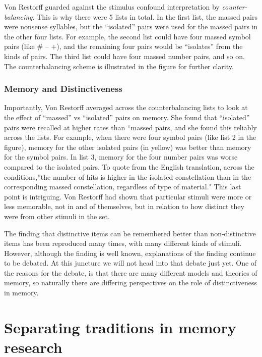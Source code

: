 \documentclass[
  oneside,
  12pt]{crumpbook}
\begin{document}
Von Restorff guarded against the stimulus confound interpretation by \emph{counter-balancing}. This is why there were 5 lists in total. In the first list, the massed pairs were nonsense syllables, but the ``isolated'' pairs were used for the massed pairs in the other four lists. For example, the second list could have four massed symbol pairs (like \# -- +), and the remaining four pairs would be ``isolates'' from the kinds of pairs. The third list could have four massed number pairs, and so on. The counterbalancing scheme is illustrated in the figure for further clarity.

\hypertarget{memory-and-distinctiveness}{%
\subsubsection{Memory and Distinctiveness}\label{memory-and-distinctiveness}}

Importantly, Von Restorff averaged across the counterbalancing lists to look at the effect of ``massed'' vs ``isolated'' pairs on memory. She found that ``isolated'' pairs were recalled at higher rates than ``massed pairs, and she found this reliably across the lists. For example, when there were four symbol pairs (like list 2 in the figure), memory for the other isolated pairs (in yellow) was better than memory for the symbol pairs. In list 3, memory for the four number pairs was worse compared to the isolated pairs. To quote from the English translation, across the conditions,''the number of hits is higher in the isolated constellation than in the corresponding massed constellation, regardless of type of material." This last point is intriguing. Von Restorff had shown that particular stimuli were more or less memorable, not in and of themselves, but in relation to how distinct they were from other stimuli in the set.

The finding that distinctive items can be remembered better than non-distinctive items has been reproduced many times, with many different kinds of stimuli. However, although the finding is well known, explanations of the finding continue to be debated. At this juncture we will not head into that debate just yet. One of the reasons for the debate, is that there are many different models and theories of memory, so naturally there are differing perspectives on the role of distinctiveness in memory.

\hypertarget{separating-traditions-in-memory-research}{%
\section{Separating traditions in memory research}\label{separating-traditions-in-memory-research}}
\end{document}
